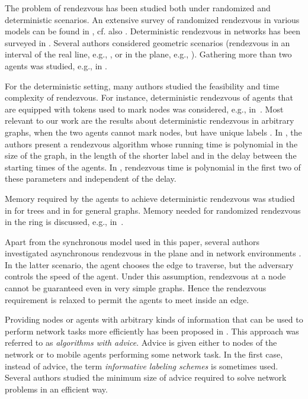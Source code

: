 \documentclass{llncs}
\begin{document}
The problem of rendezvous has been studied both under randomized and deterministic scenarios.
An extensive survey of  randomized rendezvous in various models  can be found in
\cite{alpern02b}, cf. also  \cite{alpern95a,alpern02a,anderson90,baston98}. 
Deterministic rendezvous in networks has been surveyed in \cite{Pe}.
Several authors
considered geometric scenarios (rendezvous in an interval of the real line, e.g.,  \cite{baston98,baston01},
or in the plane, e.g., \cite{anderson98a,anderson98b}).
Gathering more than two agents was studied, e.g., in \cite{fpsw,lim96,thomas92}. 
 

For the deterministic setting, many authors studied the feasibility and time complexity of rendezvous. For instance, deterministic rendezvous of agents that are equipped with tokens used to mark nodes was considered, e.g., in~\cite{KKSS}. Most relevant to our work are the results about 
deterministic rendezvous in arbitrary graphs, when the two agents cannot mark nodes, but have unique labels  \cite{DFKP,KM,TSZ07}.
In \cite{DFKP}, the authors present a rendezvous algorithm whose running time is polynomial in the size of the graph, in the length of the shorter
label and in the delay between the starting times of the agents. In \cite{KM,TSZ07}, rendezvous time is polynomial in the first two of these parameters and independent of the delay.

Memory required by the agents to achieve deterministic rendezvous was studied in \cite{FP2} for trees and in  \cite{CKP} for general graphs.
Memory needed for randomized rendezvous in the ring is discussed, e.g., in~\cite{KKPM08}. 

Apart from the synchronous model used in this paper, several authors investigated asynchronous rendezvous in the plane \cite{CFPS,fpsw} and in network environments
\cite{BCGIL,CLP,DGKKP,DPV}.
In the latter scenario, the agent chooses the edge to traverse, but the adversary controls the speed of the agent. Under this assumption, rendezvous
at a node cannot be guaranteed even in very simple graphs. Hence the rendezvous requirement is relaxed to permit the agents to meet inside an edge.

Providing nodes or agents with arbitrary kinds of information that can be used to perform network tasks more efficiently has been
proposed in \cite{AKM01,CFP,CFIKP,DP,EFKR,FGIP,FIP1,FIP2,FKL,FP,FPR,GPPR02,IKP,KKKP02,KKP05,SN,TZ05}. This approach was referred to as
{\em algorithms with advice}.  
Advice is given either to nodes of the network or to mobile agents performing some network task.
In the first case, instead of advice, the term {\em informative labeling schemes} is sometimes used.
Several authors studied the minimum size of advice required to solve
network problems in an efficient way. 
\end{document}
